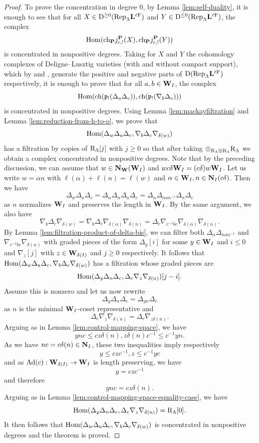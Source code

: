 \documentclass[article, 10pt, oneside, reqno]{amsart}
\theoremstyle{plain}
\theoremstyle{definition}
\theoremstyle{remark}
\begin{document}
\begin{proof}
To prove the concentration in degree $0$, by Lemma \ref{lem:self-duality}, it is enough to see that for all $X \in \mathrm{D}^{\geq 0}(\mathrm{Rep}_{\Lambda}\mathbf{L}^{\dot{c}\mathrm{F}})$ and $Y \in \mathrm{D}^{\leq 0}(\mathrm{Rep}_{\Lambda}\mathbf{L}^{\dot{c}\mathrm{F}})$, the complex 
$$\mathrm{Hom}(\mathrm{ch}_{\mathbf{P}}j_{c,!}^{\mathbf{P}}(X), \mathrm{ch}_{\mathbf{P}}j_{c,!}^{\mathbf{P}}(Y))$$
is concentrated in nonpositive degrees. Taking for $X$ and $Y$ the cohomology complexes of Deligne--Lusztig varieties (with and without compact support), which by \cite[Theorem 3.2.4]{EteveTilting} and \cite{ZhuCategoricalTame}, generate the positive and negative parts of $\mathrm{D}(\mathrm{Rep}_{\Lambda}\mathbf{L}^{\dot{c}\mathrm{F}})$ respectively, it is enough to prove that for all $a,b \in \mathbf{W}_{I}$, the complex 
$$\mathrm{Hom}(\mathrm{ch}(\mathfrak{p}_!(\Delta_a\Delta_c)), \mathrm{ch}(\mathfrak{p}_!(\nabla_b\Delta_c)))$$
is concentrated in nonpositive degrees. Using Lemma \ref{lem:mackayfiltration} and Lemma \ref{lem:reduction-from-h-to-o}, we prove that 
$$\mathrm{Hom}(\Delta_w\Delta_a\Delta_c, \nabla_b\Delta_c\nabla_{\delta(w)})$$
has a filtration by copies of $\mathrm{R}_{\Lambda}[j]$ with $j \geq 0$ so that after taking $\otimes_{\mathrm{R}_{\Lambda} \otimes \mathrm{R}_{\Lambda}} \mathrm{R}_{\Lambda}$ we obtain a complex concentrated in nonpositive degrees. Note that by the preceding discussion, we can assume that $w \in \mathbf{N}_{\mathbf{W}}(\mathbf{W}_I)$ and $wc\delta\mathbf{W}_{I} = (c\delta)w\mathbf{W}_I$. Let us write $w = \alpha n$ with $\ell(\alpha) + \ell(n) = \ell(w)$ and $\alpha \in \mathbf{W}_I, n \in \mathbf{N}_I(c\delta)$. Then we have 
$$\Delta_w\Delta_a\Delta_c = \Delta_{\alpha}\Delta_n\Delta_a\Delta_c = \Delta_{\alpha}\Delta_{nan^{-1}}\Delta_n\Delta_c$$
as $n$ normalizes $\mathbf{W}_I$ and preserves the length in $\mathbf{W}_I$. By the same argument, we also have  
$$\nabla_b\Delta_c\nabla_{\delta(w)} = \nabla_b\Delta_c\nabla_{\delta(\alpha)}\nabla_{\delta(n)} = \Delta_c\nabla_{c^{-1}bc}\nabla_{\delta(\alpha)}\nabla_{\delta(n)}.$$
By Lemma \ref{lem:filtration-product-of-delta-bis}, we can filter both $\Delta_{\alpha}\Delta_{nan^{-1}}$ and $\nabla_{c^{-1}bc}\nabla_{\delta(\alpha)}$ with graded pieces of the form $\Delta_y[i]$ for some $y \in \mathbf{W}_{I}$ and $i \leq 0$ and $\nabla_z[j]$ with $z \in \mathbf{W}_{\delta(I)}$ and $j \geq 0$ respectively. It follows that $\mathrm{Hom}(\Delta_w\Delta_a\Delta_c, \nabla_b\Delta_c\nabla_{\delta(w)})$ has a filtration whose graded pieces are 
$$\mathrm{Hom}(\Delta_y\Delta_n\Delta_c, \Delta_c\nabla_z\nabla_{\delta(n)})[j-i].$$
Assume this is nonzero and let us now rewrite 
$$\Delta_y\Delta_n\Delta_c = \Delta_{yn}\Delta_c$$
as $n$ is the minimal $\mathbf{W}_I$-coset representative and 
$$\Delta_c\nabla_z\nabla_{\delta(n)} = \Delta_c\nabla_{z\delta(n)}.$$
Arguing as in Lemma \ref{lem:control-mapping-space}, we have 
$$ync \leq cz\delta(n), z\delta(n)c^{-1} \leq c^{-1}yn.$$
As we have $nc = c\delta(n) \in \mathbf{N}_I$, these two inequalities imply respectively 
$$y \leq czc^{-1}, z \leq c^{-1}yc$$ 
and as $\mathrm{Ad}(c) : \mathbf{W}_{\delta(I)} \to \mathbf{W}_{I}$ is length preserving, we have 
$$y = czc^{-1}$$
and therefore
$$ync = cz\delta(n).$$
Arguing as in Lemma \ref{lem:control-mapping-space-equality-case}, we have 
$$\mathrm{Hom}(\Delta_y\Delta_n\Delta_c, \Delta_c\nabla_z\nabla_{\delta(n)}) = \mathrm{R}_{\Lambda}[0].$$
It then follows that $\mathrm{Hom}(\Delta_w\Delta_a\Delta_c, \nabla_b\Delta_c\nabla_{\delta(w)})$ is concentrated in nonpositive degrees and the theorem is proved.
\end{proof}




\end{document}
